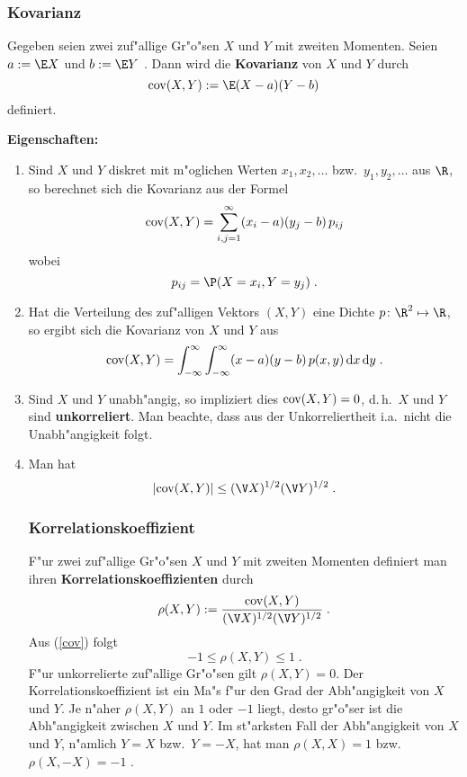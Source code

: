 \subsubsection{Kovarianz}
Gegeben seien zwei zuf"allige Gr"o"sen $X$ und $Y$ mit zweiten Momenten.
Seien $a:=\E X$ und $b:=\E Y$ . Dann wird die \textbf{Kovarianz} von $X$ und $Y$ durch
$$
{\rm  cov}(X,Y):= \E(X-a)(Y-b)
$$
definiert.

\textbf{Eigenschaften:}

\begin{enumerate}
\item
Sind $X$ und $Y$ diskret mit m"oglichen Werten $x_1,x_2,\ldots$ bzw.~$y_1,y_2,\ldots$ aus $\R$,
so berechnet sich die Kovarianz aus der Formel
$$
{\rm  cov}(X,Y)=\sum_{i,j=1}^\infty (x_i-a)(y_j-b)\, p_{ij}
$$
wobei
$$
p_{ij}=\P(X=x_i, Y=y_j)\;.
$$
\item
Hat die Verteilung des zuf"alligen Vektors $(X,Y)$ eine Dichte $p \colon\R^2\mapsto\R$, so
ergibt sich die Kovarianz von $X$ und $Y$ aus
$$
{\rm  cov}(X,Y)=\int_{-\infty}^\infty \int_{-\infty}^\infty (x-a)(y-b)\,p(x,y)\,\mathrm d x\, \mathrm d y\;.
$$
\item
Sind $X$ und $Y$ unabh"angig, so impliziert dies ${\rm  cov}(X,Y)=0$, d.\,h.~$X$ und $Y$ sind
\textbf{unkorreliert}. Man beachte, dass aus der Unkorreliertheit i.a.~nicht die Unabh"angigkeit folgt.
\item
Man hat
\begin{equation}
\label{cov}
|{\rm  cov}(X,Y)|\le (\V X)^{1/2}(\V Y)^{1/2}\;.
\end{equation}
\subsubsection{Korrelationskoeffizient}
F"ur zwei zuf"allige Gr"o"sen $X$ und $Y$ mit zweiten Momenten definiert man ihren
\textbf{Korrelationskoeffizienten} durch
$$
\rho(X,Y):=\frac{{\rm  cov}(X,Y)}{(\V X)^{1/2}(\V Y)^{1/2}}\;.
$$
Aus (\ref{cov}) folgt
$$
-1\le \rho(X,Y)\le 1\;.
$$
F"ur unkorrelierte zuf"allige Gr"o"sen gilt $\rho(X,Y)=0$.
 Der Korrelationskoeffizient ist ein Ma"s f"ur den Grad der Abh"angigkeit von
$X$ und $Y$. Je n"aher $\rho(X,Y)$ an $1$ oder $-1$ liegt, desto gr"o"ser ist die
Abh"angigkeit zwischen $X$ und $Y$. Im st"arksten Fall
der Abh"angigkeit von $X$ und $Y$, n"amlich $Y=X$ bzw.~$Y=-X$, hat man $\rho(X,X)=1$ bzw.~$\rho(X,-X)=-1$ .
\end{enumerate}








